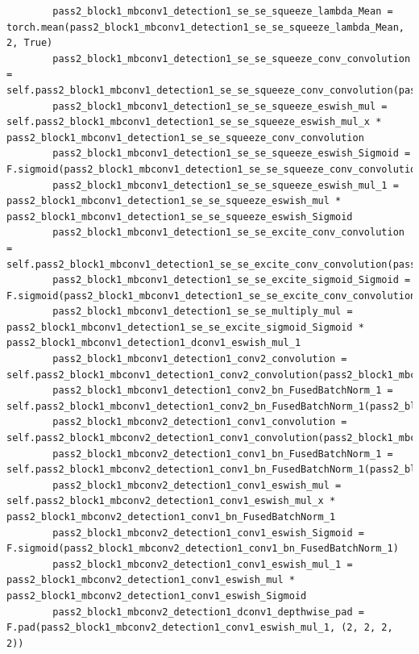 \documentclass{fisatprojectfinal}
\begin{document}
\begin{appendices}
\begin{lstlisting}
        pass2_block1_mbconv1_detection1_se_se_squeeze_lambda_Mean = torch.mean(pass2_block1_mbconv1_detection1_se_se_squeeze_lambda_Mean, 2, True)
        pass2_block1_mbconv1_detection1_se_se_squeeze_conv_convolution = self.pass2_block1_mbconv1_detection1_se_se_squeeze_conv_convolution(pass2_block1_mbconv1_detection1_se_se_squeeze_lambda_Mean)
        pass2_block1_mbconv1_detection1_se_se_squeeze_eswish_mul = self.pass2_block1_mbconv1_detection1_se_se_squeeze_eswish_mul_x * pass2_block1_mbconv1_detection1_se_se_squeeze_conv_convolution
        pass2_block1_mbconv1_detection1_se_se_squeeze_eswish_Sigmoid = F.sigmoid(pass2_block1_mbconv1_detection1_se_se_squeeze_conv_convolution)
        pass2_block1_mbconv1_detection1_se_se_squeeze_eswish_mul_1 = pass2_block1_mbconv1_detection1_se_se_squeeze_eswish_mul * pass2_block1_mbconv1_detection1_se_se_squeeze_eswish_Sigmoid
        pass2_block1_mbconv1_detection1_se_se_excite_conv_convolution = self.pass2_block1_mbconv1_detection1_se_se_excite_conv_convolution(pass2_block1_mbconv1_detection1_se_se_squeeze_eswish_mul_1)
        pass2_block1_mbconv1_detection1_se_se_excite_sigmoid_Sigmoid = F.sigmoid(pass2_block1_mbconv1_detection1_se_se_excite_conv_convolution)
        pass2_block1_mbconv1_detection1_se_se_multiply_mul = pass2_block1_mbconv1_detection1_se_se_excite_sigmoid_Sigmoid * pass2_block1_mbconv1_detection1_dconv1_eswish_mul_1
        pass2_block1_mbconv1_detection1_conv2_convolution = self.pass2_block1_mbconv1_detection1_conv2_convolution(pass2_block1_mbconv1_detection1_se_se_multiply_mul)
        pass2_block1_mbconv1_detection1_conv2_bn_FusedBatchNorm_1 = self.pass2_block1_mbconv1_detection1_conv2_bn_FusedBatchNorm_1(pass2_block1_mbconv1_detection1_conv2_convolution)
        pass2_block1_mbconv2_detection1_conv1_convolution = self.pass2_block1_mbconv2_detection1_conv1_convolution(pass2_block1_mbconv1_detection1_conv2_bn_FusedBatchNorm_1)
        pass2_block1_mbconv2_detection1_conv1_bn_FusedBatchNorm_1 = self.pass2_block1_mbconv2_detection1_conv1_bn_FusedBatchNorm_1(pass2_block1_mbconv2_detection1_conv1_convolution)
        pass2_block1_mbconv2_detection1_conv1_eswish_mul = self.pass2_block1_mbconv2_detection1_conv1_eswish_mul_x * pass2_block1_mbconv2_detection1_conv1_bn_FusedBatchNorm_1
        pass2_block1_mbconv2_detection1_conv1_eswish_Sigmoid = F.sigmoid(pass2_block1_mbconv2_detection1_conv1_bn_FusedBatchNorm_1)
        pass2_block1_mbconv2_detection1_conv1_eswish_mul_1 = pass2_block1_mbconv2_detection1_conv1_eswish_mul * pass2_block1_mbconv2_detection1_conv1_eswish_Sigmoid
        pass2_block1_mbconv2_detection1_dconv1_depthwise_pad = F.pad(pass2_block1_mbconv2_detection1_conv1_eswish_mul_1, (2, 2, 2, 2))

\end{lstlisting}
\end{appendices}
\end{document}
